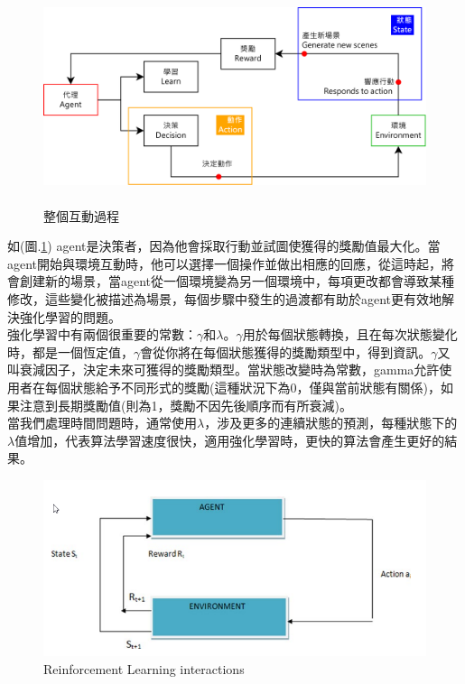 \documentclass[14pt,a4paper]{report}  %
\begin{document}
\begin{figure}[hbt!]
\begin{center}
\includegraphics[height=6.3cm]{The_entire_interaction_process}
\caption{\Large 整個互動過程}
\label{整個互動過程}
\end{center}
\end{figure}
 如(圖.\ref{整個互動過程}) agent是決策者，因為他會採取行動並試圖使獲得的獎勵值最大化。當agent開始與環境互動時，他可以選擇一個操作並做出相應的回應，從這時起，將會創建新的場景，當agent從一個環境變為另一個環境中，每項更改都會導致某種修改，這些變化被描述為場景，每個步驟中發生的過渡都有助於agent更有效地解決強化學習的問題。\\
 強化學習中有兩個很重要的常數：$\gamma$和$\lambda$。$\gamma$用於每個狀態轉換，且在每次狀態變化時，都是一個恆定值，$\gamma$會從你將在每個狀態獲得的獎勵類型中，得到資訊。$\gamma$又叫衰減因子，決定未來可獲得的獎勵類型。當狀態改變時為常數，gamma允許使用者在每個狀態給予不同形式的獎勵(這種狀況下為0，僅與當前狀態有關係)，如果注意到長期獎勵值(則為1，獎勵不因先後順序而有所衰減)。\\
 當我們處理時間問題時，通常使用$\lambda$，涉及更多的連續狀態的預測，每種狀態下的$\lambda$值增加，代表算法學習速度很快，適用強化學習時，更快的算法會產生更好的結果。\\
\iffalse
\begin{figure}[hbt!]
\begin{center}
\includegraphics[scale=0.74]{ Reinforcement_Learning_interactions}
\caption{\Large Reinforcement Learning interactions}
\end{center}
\end{figure}
\end{document}
